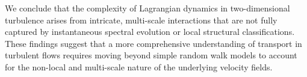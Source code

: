 \documentclass[]{article}
\begin{document}
We conclude that the complexity of Lagrangian dynamics in two-dimensional turbulence arises from intricate, multi-scale interactions that are not fully captured by instantaneous spectral evolution or local structural classifications. These findings suggest that a more comprehensive understanding of transport in turbulent flows requires moving beyond simple random walk models to account for the non-local and multi-scale nature of the underlying velocity fields.


{}

\end{document}
